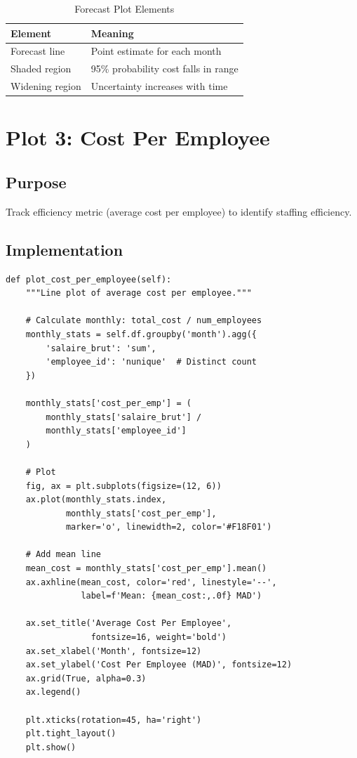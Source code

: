 \begin{table}[H]
\centering
\begin{tabular}{ll}
\toprule
\textbf{Element} & \textbf{Meaning} \\
\midrule
Forecast line & Point estimate for each month \\
Shaded region & 95\% probability cost falls in range \\
Widening region & Uncertainty increases with time \\
\bottomrule
\end{tabular}
\caption{Forecast Plot Elements}
\end{table}

\section{Plot 3: Cost Per Employee}

\subsection{Purpose}
Track efficiency metric (average cost per employee) to identify staffing efficiency.

\subsection{Implementation}

\begin{lstlisting}[style=pythonstyle]
def plot_cost_per_employee(self):
    """Line plot of average cost per employee."""
    
    # Calculate monthly: total_cost / num_employees
    monthly_stats = self.df.groupby('month').agg({
        'salaire_brut': 'sum',
        'employee_id': 'nunique'  # Distinct count
    })
    
    monthly_stats['cost_per_emp'] = (
        monthly_stats['salaire_brut'] / 
        monthly_stats['employee_id']
    )
    
    # Plot
    fig, ax = plt.subplots(figsize=(12, 6))
    ax.plot(monthly_stats.index, 
            monthly_stats['cost_per_emp'],
            marker='o', linewidth=2, color='#F18F01')
    
    # Add mean line
    mean_cost = monthly_stats['cost_per_emp'].mean()
    ax.axhline(mean_cost, color='red', linestyle='--',
               label=f'Mean: {mean_cost:,.0f} MAD')
    
    ax.set_title('Average Cost Per Employee',
                 fontsize=16, weight='bold')
    ax.set_xlabel('Month', fontsize=12)
    ax.set_ylabel('Cost Per Employee (MAD)', fontsize=12)
    ax.grid(True, alpha=0.3)
    ax.legend()
    
    plt.xticks(rotation=45, ha='right')
    plt.tight_layout()
    plt.show()
\end{lstlisting}

